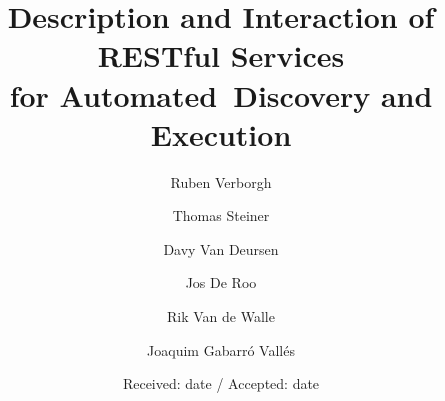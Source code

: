 \documentclass[smallextended]{svjour3}
\renewenvironment{abstract}{\section*{\makebox[3.5cm]{}Abstract}}
\begin{document}
\title{Description and Interaction of RESTful Services\\ for Automated~Discovery and Execution}

\author{Ruben Verborgh \and Thomas Steiner \and Davy Van Deursen \and Jos De Roo \and Rik Van de Walle \and Joaquim Gabarr\'o Vall\'es}


\date{Received: date / Accepted: date}

\maketitle

\begin{abstract}
Many have left their footprints on the field of semantic RESTful Web service description. Albeit some of the propositions are even W3C Recommendations, none of the proposed standards could gain significant adoption with Web service providers. Some approaches were supposedly too complex and verbose, others were considered not RESTful, and some failed to reach a significant majority of API providers for a combination of the reasons above. While we neither have the silver bullet for universal Web service description, with this paper, we want to suggest a lightweight approach called RESTdesc. It expresses the semantics of Web services by pre- and postconditions in simple N3~rules, and integrates existing standards and conventions such as Link headers, HTTP OPTIONS, and URI templates for discovery and interaction. This approach keeps the complexity to a minimum, yet still enables service descriptions with full semantic expressiveness. A sample implementation on the topic of multimedia Web services verifies the effectiveness of our~approach.
\end{abstract}
\end{document}
